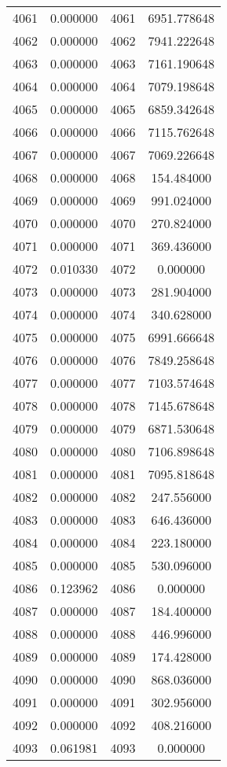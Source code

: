 \documentclass[12pt]{article}
\begin{document}
\begin{longtable}{@{}cccc@{}}
4061 & 0.000000 & 4061 & 6951.778648 \\
4062 & 0.000000 & 4062 & 7941.222648 \\
4063 & 0.000000 & 4063 & 7161.190648 \\
4064 & 0.000000 & 4064 & 7079.198648 \\
4065 & 0.000000 & 4065 & 6859.342648 \\
4066 & 0.000000 & 4066 & 7115.762648 \\
4067 & 0.000000 & 4067 & 7069.226648 \\
4068 & 0.000000 & 4068 & 154.484000 \\
4069 & 0.000000 & 4069 & 991.024000 \\
4070 & 0.000000 & 4070 & 270.824000 \\
4071 & 0.000000 & 4071 & 369.436000 \\
4072 & 0.010330 & 4072 & 0.000000 \\
4073 & 0.000000 & 4073 & 281.904000 \\
4074 & 0.000000 & 4074 & 340.628000 \\
4075 & 0.000000 & 4075 & 6991.666648 \\
4076 & 0.000000 & 4076 & 7849.258648 \\
4077 & 0.000000 & 4077 & 7103.574648 \\
4078 & 0.000000 & 4078 & 7145.678648 \\
4079 & 0.000000 & 4079 & 6871.530648 \\
4080 & 0.000000 & 4080 & 7106.898648 \\
4081 & 0.000000 & 4081 & 7095.818648 \\
4082 & 0.000000 & 4082 & 247.556000 \\
4083 & 0.000000 & 4083 & 646.436000 \\
4084 & 0.000000 & 4084 & 223.180000 \\
4085 & 0.000000 & 4085 & 530.096000 \\
4086 & 0.123962 & 4086 & 0.000000 \\
4087 & 0.000000 & 4087 & 184.400000 \\
4088 & 0.000000 & 4088 & 446.996000 \\
4089 & 0.000000 & 4089 & 174.428000 \\
4090 & 0.000000 & 4090 & 868.036000 \\
4091 & 0.000000 & 4091 & 302.956000 \\
4092 & 0.000000 & 4092 & 408.216000 \\
4093 & 0.061981 & 4093 & 0.000000 \\

\end{longtable}
\end{document}
